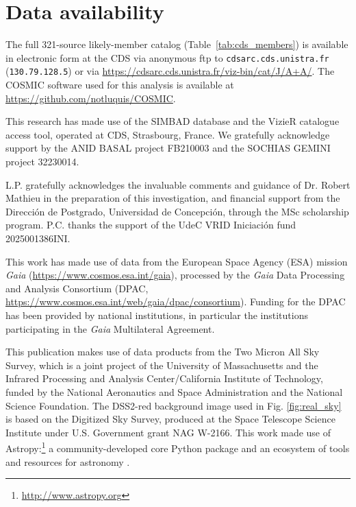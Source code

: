 \documentclass{aa}
\begin{document}
\section*{Data availability}
The full 321-source likely-member catalog (Table~\ref{tab:cds_members}) is available in electronic form at the CDS via anonymous ftp to \texttt{cdsarc.cds.unistra.fr} (\texttt{130.79.128.5}) or via \url{https://cdsarc.cds.unistra.fr/viz-bin/cat/J/A+A/}. The \textsc{COSMIC} software used for this analysis is available at \url{https://github.com/notluquis/COSMIC}.

\begin{acknowledgements}
This research has made use of the SIMBAD database and the VizieR catalogue access tool, operated at CDS, Strasbourg, France. We gratefully acknowledge support by the ANID BASAL project FB210003 and the SOCHIAS GEMINI project 32230014.

L.P. gratefully acknowledges the invaluable comments and guidance of Dr. Robert Mathieu in the preparation of this investigation, and financial support from the Dirección de Postgrado, Universidad de Concepción, through the MSc scholarship program. P.C. thanks the support of the UdeC VRID Iniciación fund 2025001386INI.

This work has made use of data from the European Space Agency (ESA) mission \textit{Gaia} (\url{https://www.cosmos.esa.int/gaia}), processed by the \textit{Gaia} Data Processing and Analysis Consortium (DPAC, \url{https://www.cosmos.esa.int/web/gaia/dpac/consortium}). Funding for the DPAC has been provided by national institutions, in particular the institutions participating in the \textit{Gaia} Multilateral Agreement. 

This publication makes use of data products from the Two Micron All Sky Survey, which is a joint project of the University of Massachusetts and the Infrared Processing and Analysis Center/California Institute of Technology, funded by the National Aeronautics and Space Administration and the National Science Foundation. The DSS2-red background image used in Fig. \ref{fig:real_sky} is based on the Digitized Sky Survey, produced at the Space Telescope Science Institute under U.S. Government grant NAG W-2166. This work made use of Astropy:\footnote{\url{http://www.astropy.org}} a community-developed core Python package and an ecosystem of tools and resources for astronomy \citep{astropy:2013, astropy:2018, astropy:2022}.
\end{acknowledgements}


 
\end{document}
